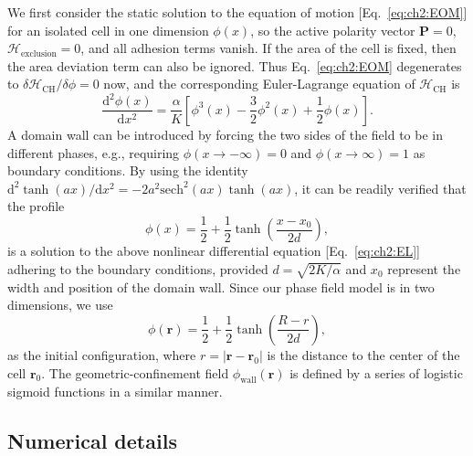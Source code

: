 We first consider the static solution to the equation of motion [Eq.~\eqref{eq:ch2:EOM}] for an isolated cell in one dimension $\phi(x)$, so the active polarity vector $\mathbf{P}=0$, $\mathcal{H}_\textrm{exclusion}=0$, and all adhesion terms vanish.
If the area of the cell is fixed, then the area deviation term can also be ignored.
Thus Eq.~\eqref{eq:ch2:EOM} degenerates to $\delta\mathcal{H}_{\textrm{CH}}/\delta\phi=0$ now, and the corresponding Euler-Lagrange equation of $\mathcal{H}_\textrm{CH}$ is~\cite{mueller2019emergence}
\begin{equation}\label{eq:ch2:EL}
    \frac{\mathrm{d}^2\phi(x)}{\mathrm{d} x^2}=\frac{\alpha}{K}\left[\phi^3(x)-\frac{3}{2}\phi^2(x)+\frac{1}{2}\phi(x)\right].
\end{equation}
A domain wall can be introduced by forcing the two sides of the field to be in different phases, e.g., requiring $\phi(x\to-\infty)=0$ and $\phi(x\to\infty)=1$ as boundary conditions.
By using the identity $\mathrm{d}^2\tanh(ax)/\mathrm{d} x^2=-2a^2\mathrm{sech}^2(ax)\tanh(ax)$, it can be readily verified that the profile
\begin{equation}
    \phi(x)=\frac{1}{2}+\frac{1}{2}\tanh\left(\frac{x-x_0}{2d}\right),
\end{equation}
is a solution to the above nonlinear differential equation [Eq.~\eqref{eq:ch2:EL}] adhering to the boundary conditions, provided $d=\sqrt{2K/\alpha}$ and $x_0$ represent the width and position of the domain wall.
Since our phase field model is in two dimensions, we use
\begin{equation}
    \phi(\mathbf{r})=\frac{1}{2}+\frac{1}{2}\tanh\left(\frac{R-r}{2d}\right),
\end{equation}
as the initial configuration, where $r=|\mathbf{r}-\mathbf{r}_0|$ is the distance to the center of the cell $\mathbf{r}_0$.
The geometric-confinement field $\phi_\textrm{wall}(\mathbf r)$ is defined by a series of logistic sigmoid functions in a similar manner.


\subsection{Numerical details}
\label{sec:ch2:numerical}

